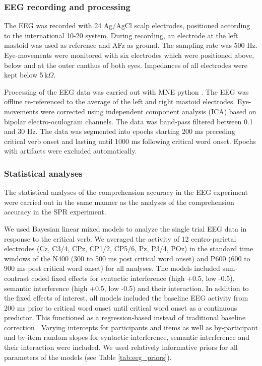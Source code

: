 \documentclass[review,preprint,12pt,authoryear,floatsintext]{elsarticle}
\begin{document}
\subsubsection{EEG recording and processing}
The EEG was recorded with 24 Ag/AgCl scalp electrodes, positioned according to the international 10-20 system. During recording, an electrode at the left mastoid was used as reference and AFz as ground. The sampling rate was 500 Hz. Eye-movements were monitored with six electrodes which were positioned above, below and at the outer canthus of both eyes. Impedances of all electrodes were kept below 5\,k$\Omega$.

Processing of the EEG data was carried out with MNE python \citep{mne}. The EEG was offline re-referenced to the average of the left and right mastoid electrodes. Eye-movements were corrected using independent component analysis (ICA) based on bipolar electro-oculogram channels. The data was band-pass filtered between 0.1 and 30 Hz. The data was segmented into epochs starting 200 ms preceding critical verb onset and lasting until 1000 ms following critical word onset. Epochs with artifacts were excluded automatically.

\subsubsection{Statistical analyses}
The statistical analyses of the comprehension accuracy in the EEG experiment were carried out in the same manner as the analyses of the comprehension accuracy in the SPR experiment.

We used Bayesian linear mixed models to analyze the single trial EEG data in response to the critical verb. We averaged the activity of 12 centro-parietal electrodes (Cz, C3/4, CPz, CP1/2, CP5/6, Pz, P3/4, POz) in the standard time windows of the  N400 (300 to 500 ms post critical word onset) and P600 (600 to 900 ms post critical word onset) for all analyses. The models included sum-contrast coded fixed effects for syntactic interference (high +0.5, low -0.5), semantic interference (high +0.5, low -0.5) and their interaction. In addition to the fixed effects of interest, all models included the baseline EEG activity from 200 ms prior to critical word onset until critical word onset as a continuous predictor. This functioned as a regression-based instead of traditional baseline correction \citep{alday2019}. Varying intercepts for participants and items as well as by-participant and by-item random slopes for syntactic interference, semantic interference and their interaction were included. We used relatively informative priors for all parameters of the models (see Table \ref{tab:eeg_priors}). 
\end{document}
